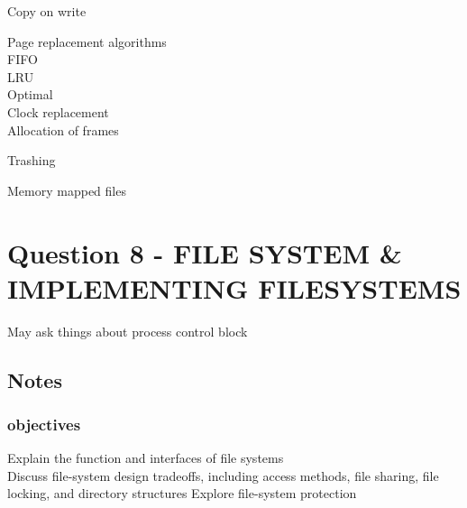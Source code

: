 \documentclass[a4paper,10pt,titlepage]{report}
\begin{document}
Copy on write \\

\vspace{5mm}

Page replacement algorithms \\
\hspace{10mm}	FIFO \\
\hspace{10mm}	LRU \\
\hspace{10mm}	Optimal \\
\hspace{10mm}   Clock replacement \\

\vspace{5mm}
Allocation of frames \\


\vspace{5mm}


Trashing \\

\vspace{5mm}


Memory mapped files \\

\vspace{5mm}












\section{Question 8 - FILE SYSTEM \& IMPLEMENTING FILESYSTEMS }

May ask things about process control block


\subsection{Notes}
\subsubsection{objectives}

Explain the function and interfaces of file systems\\

Discuss file-system design tradeoffs, including access
methods, file sharing, file locking, and directory structures
Explore file-system protection \\
\end{document}
